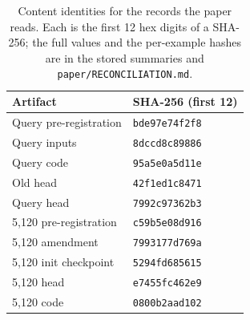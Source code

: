 \begin{table}[t]
\centering
\footnotesize
\caption{Content identities for the records the paper reads. Each is the first
12 hex digits of a SHA-256; the full values and the per-example hashes are in
the stored summaries and \texttt{paper/RECONCILIATION.md}.}
\label{tab:hashes}
\begin{tabular}{@{}ll@{}}
\toprule
Artifact & SHA-256 (first 12) \\
\midrule
Query pre-registration & \texttt{bde97e74f2f8} \\
Query inputs & \texttt{8dccd8c89886} \\
Query code & \texttt{95a5e0a5d11e} \\
Old head & \texttt{42f1ed1c8471} \\
Query head & \texttt{7992c97362b3} \\
5,120 pre-registration & \texttt{c59b5e08d916} \\
5,120 amendment & \texttt{7993177d769a} \\
5,120 init checkpoint & \texttt{5294fd685615} \\
5,120 head & \texttt{e7455fc462e9} \\
5,120 code & \texttt{0800b2aad102} \\
\bottomrule
\end{tabular}
\end{table}
